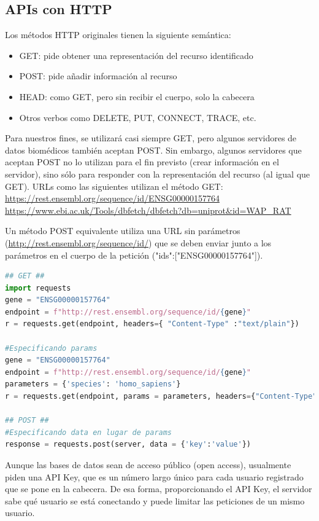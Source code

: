 \subsection{APIs con HTTP}
Los métodos HTTP originales tienen la siguiente semántica:
\begin{itemize}
\item GET: pide obtener una representación del recurso identificado
\item POST: pide añadir información al recurso
\item HEAD: como GET, pero sin recibir el cuerpo, solo la cabecera
\item Otros verbos como DELETE, PUT, CONNECT, TRACE, etc.
\end{itemize}

Para nuestros fines, se utilizará casi siempre GET, pero algunos servidores de datos biomédicos también aceptan POST. Sin embargo, algunos servidores que aceptan POST no lo utilizan para el fin previsto (crear información en el servidor), sino sólo para responder con la representación del recurso (al igual que GET).
URLs como las siguientes utilizan el método GET: \\
\href{https://rest.ensembl.org/sequence/id/ENSG00000157764}{https://rest.ensembl.org/sequence/id/ENSG00000157764} \\
\href{https://www.ebi.ac.uk/Tools/dbfetch/dbfetch?db=uniprot\&id=WAP\_RAT}{https://www.ebi.ac.uk/Tools/dbfetch/dbfetch?db=uniprot\&id=WAP\_RAT}

Un método POST equivalente utiliza una URL sin parámetros (\href{http://rest.ensembl.org/sequence/id/}{http://rest.ensembl.org/sequence/id/}) que se deben enviar junto a los parámetros en el cuerpo de la petición ({"ids":["ENSG00000157764"]}).
\begin{lstlisting}[language=Python]
## GET ##
import requests
gene = "ENSG00000157764"
endpoint = f"http://rest.ensembl.org/sequence/id/{gene}"
r = requests.get(endpoint, headers={ "Content-Type" :"text/plain"})

#Especificando params
gene = "ENSG00000157764"
endpoint = f"http://rest.ensembl.org/sequence/id/{gene}"
parameters = {'species': 'homo_sapiens'}
r = requests.get(endpoint, params = parameters, headers={"Content-Type" : "text/json"})

## POST ##
#Especificando data en lugar de params
response = requests.post(server, data = {'key':'value'})
\end{lstlisting}

Aunque las bases de datos sean de acceso público (open access), usualmente piden una API Key, que es un número largo único para cada usuario registrado que se pone en la cabecera. De esa forma, proporcionando el API Key, el servidor sabe qué usuario se está conectando y puede limitar las peticiones de un mismo usuario.

